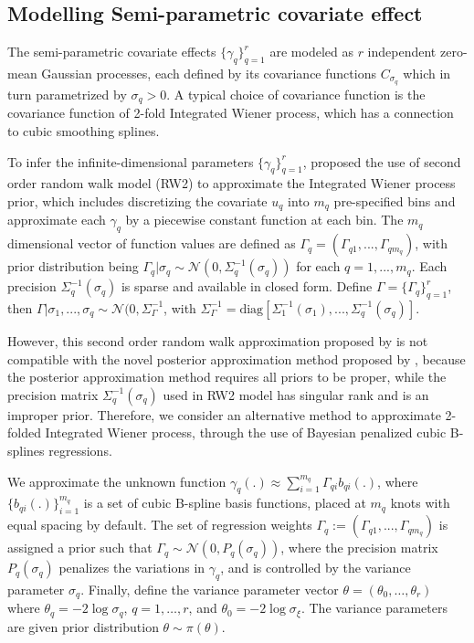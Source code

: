 \documentclass[ba]{imsart}
\begin{document}
\subsection{Modelling Semi-parametric covariate effect}\label{subsec:smooth}
The semi-parametric covariate effects $\{\gamma_q\}_{q=1}^{r}$ are modeled as $r$ independent zero-mean Gaussian processes, each defined by its covariance functions $C_{\sigma_{q}}$ which in turn parametrized by $\sigma_q > 0$. A typical choice of covariance function is the covariance function of 2-fold Integrated Wiener process\citep{wiener}, which has a connection to cubic smoothing splines\citep{wahbaprior}.

To infer the infinite-dimensional parameters $\{\gamma_q\}_{q=1}^{r}$, \cite{rw2} proposed the use of second order random walk model (RW2) to approximate the Integrated Wiener process prior, which includes discretizing the covariate $u_q$ into $m_q$ pre-specified bins and approximate each $\gamma_q$ by a piecewise constant function at each bin. The $m_q$ dimensional vector of function values are defined as $\Gamma_q = (\Gamma_{q1}, ..., \Gamma_{qm_q})$, with prior distribution being $\Gamma_q|\sigma_q \sim \mathcal{N}(0,\Sigma_q^{-1}(\sigma_q))$ for each $q = 1,...,m_q$. Each precision $\Sigma_q^{-1}(\sigma_q)$ is sparse and available in closed form. Define $\Gamma = \{\Gamma_q\}_{q=1}^{r}$, then $\Gamma|\sigma_1,...,\sigma_q \sim \mathcal{N}(0,\Sigma_\Gamma^{-1}$, with $\Sigma_\Gamma^{-1} = \text{diag}[\Sigma_1^{-1}(\sigma_1), ..., \Sigma_q^{-1}(\sigma_q)]$.

However, this second order random walk approximation proposed by \cite{rw2} is not compatible with the novel posterior approximation method proposed by \cite{ELGM}, because the posterior approximation method requires all priors to be proper, while the precision matrix $\Sigma_q^{-1}(\sigma_q)$ used in RW2 model has singular rank and is an improper prior. Therefore, we consider an alternative method to approximate 2-folded Integrated Wiener process, through the use of Bayesian penalized cubic B-splines regressions.

We approximate the unknown function $\gamma_q(.) \approx \sum_{i=1}^{m_q} \Gamma_{qi} b_{qi}(.)$, where $\{b_{qi}(.)\}_{i=1}^{m_q}$ is a set of cubic B-spline basis functions, placed at $m_q$ knots with equal spacing by default. The set of regression weights $\Gamma_q := (\Gamma_{q1},...,\Gamma_{qm_q})$ is assigned a prior such that $\Gamma_q \sim \mathcal{N}(0,P_q(\sigma_q))$, where the precision matrix $P_q(\sigma_q)$ penalizes the variations in $\gamma_q$, and is controlled by the variance parameter $\sigma_q$. Finally, define the variance parameter vector $\theta = (\theta_{0},\ldots,\theta_{r})$ where $\theta_{q} = -2\log\sigma_{q}$, $q = 1,\ldots,r$, and $\theta_{0} = -2\log\sigma_{\xi}$. The variance parameters are given prior distribution $\theta \sim \pi(\theta)$. 
\end{document}
